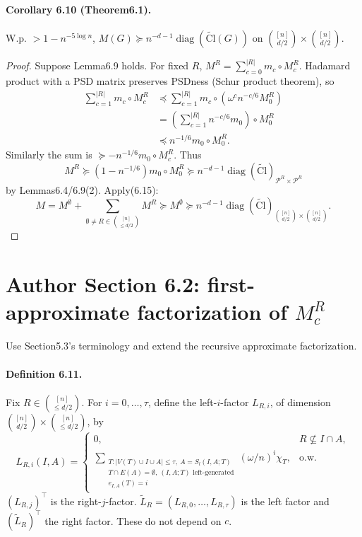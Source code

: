 \documentclass[10pt,a4paper]{article}
\begin{document}
\paragraph{Corollary 6.10 (Theorem6.1).} W.p. $>1-n^{-5\log n}$, $M(G)\succeq n^{-d-1}\operatorname{diag}(\widetilde{\mathrm{Cl}}(G))$ on $\binom{[n]}{d/2}\times\binom{[n]}{d/2}$.
\begin{proof}Suppose Lemma6.9 holds. For fixed $R$, $M^R=\sum_{c=0}^{|R|}m_c\circ M_c^R$. Hadamard product with a PSD matrix preserves PSDness (Schur product theorem), so
\begin{align*}\sum_{c=1}^{|R|}m_c\circ M_c^R&\preceq\sum_{c=1}^{|R|}m_c\circ(\omega^cn^{-c/6}M_0^R)\\&=\left(\sum_{c=1}^{|R|}n^{-c/6}m_0\right)\circ M_0^R\\&\preceq n^{-1/6}m_0\circ M_0^R.\end{align*}
Similarly the sum is $\succeq-n^{-1/6}m_0\circ M_c^R$. Thus
\[M^R\succeq(1-n^{-1/6})m_0\circ M_0^R\succeq n^{-d-1}\operatorname{diag}(\widetilde{\mathrm{Cl}})_{\mathcal P^R\times\mathcal P^R}\]
by Lemmas6.4/6.9(2). Apply(6.15):
\[M=M^\emptyset+\sum_{\emptyset\ne R\in\binom{[n]}{\le d/2}}M^R\succeq M^\emptyset\succeq n^{-d-1}\operatorname{diag}(\widetilde{\mathrm{Cl}})_{\binom{[n]}{d/2}\times\binom{[n]}{d/2}}.\tag{6.19}\]\end{proof}

\section*{Author Section 6.2: first-approximate factorization of $M_c^R$}
Use Section5.3's terminology and extend the recursive approximate factorization.
\paragraph{Definition 6.11.} Fix $R\in\binom{[n]}{\le d/2}$. For $i=0,\ldots,\tau$, define the left-$i$-factor $L_{R,i}$, of dimension $\binom{[n]}{d/2}\times\binom{[n]}{\le d/2}$, by
\[L_{R,i}(I,A)=\begin{cases}0,&R\not\subseteq I\cap A,\\\displaystyle\sum_{\substack{T:|V(T)\cup I\cup A|\le\tau,\ A=S_l(I,A;T)\\T\cap E(A)=\emptyset,\ (I,A;T)\text{ left-generated}\\e_{I,A}(T)=i}}(\omega/n)^i\chi_T,&\text{o.w.}\end{cases}\tag{6.20}\]
$(L_{R,j})^\top$ is the right-$j$-factor. $\widetilde L_R=(L_{R,0},\ldots,L_{R,\tau})$ is the left factor and $(\widetilde L_R)^\top$ the right factor. These do not depend on $c$.
\end{document}
